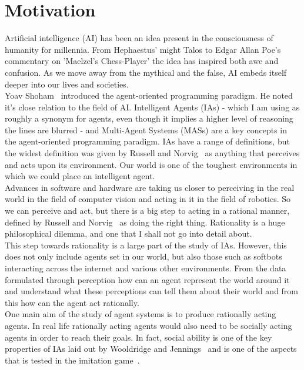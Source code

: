 \documentclass[]{final_report}
\begin{document}
\section{Motivation}
Artificial intelligence (AI) has been an idea present in the consciousness of humanity for millennia. From Hephaestus' might Talos to Edgar Allan Poe's commentary on 'Maelzel's Chess-Player' the idea has inspired both awe and confusion. As we move away from the mythical and the false, AI embeds itself deeper into our lives and societies.\\
Yoav Shoham~\cite{shoham1993agent} introduced the agent-oriented programming paradigm. He noted it's close relation to the field of AI. Intelligent Agents (IAs) - which I am using as roughly a synonym for agents, even though it implies a higher level of reasoning the lines are blurred - and Multi-Agent Systems (MASs) are a key concepts in the agent-oriented programming paradigm. IAs have a range of definitions, but the widest definition was given by Russell and Norvig~\cite{russell2016artificial} as anything that perceives and acts upon its environment. Our world is one of the toughest environments in which we could place an intelligent agent.\\
Advances in software and hardware are taking us closer to perceiving in the real world in the field of computer vision and acting in it in the field of robotics. So we can perceive and act, but there is a big step to acting in a rational manner, defined by Russell and Norvig~\cite{russell2016artificial} as doing the right thing. Rationality is a huge philosophical dilemma, and one that I shall not go into detail about.\\
This step towards rationality is a large part of the study of IAs. However, this does not only include agents set in our world, but also those such as softbots interacting across the internet and various other environments. From the data formulated through perception how can an agent represent the world around it and understand what these perceptions can tell them about their world and from this how can the agent act rationally.\\
One main aim of the study of agent systems is to produce rationally acting agents. In real life rationally acting agents would also need to be socially acting agents in order to reach their goals. In fact, social ability is one of the key properties of IAs laid out by Wooldridge and Jennings~\cite{wooldridge_jennings_1995} and is one of the aspects that is tested in the imitation game~\cite{machinery1950computing}.\\
\end{document}
